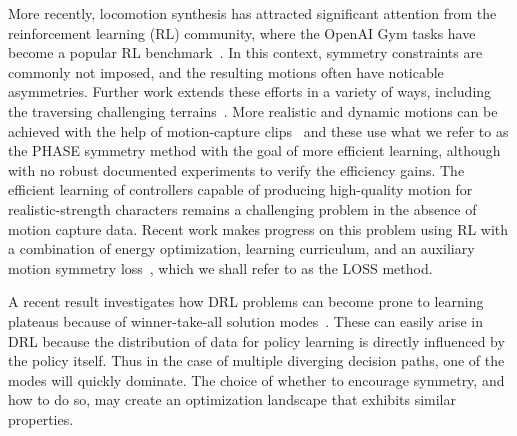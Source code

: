 More recently, locomotion synthesis has attracted significant
attention from the reinforcement learning (RL) community, where the OpenAI Gym tasks have 
become a popular RL benchmark~\cite{ref:OpenAI-Gym}. In this context, symmetry constraints are commonly 
not imposed, and the resulting motions often have noticable asymmetries. 
Further work extends these efforts in a variety of ways, including the traversing challenging terrains~\cite{ref:deepmindParkour}.
More realistic and dynamic motions can be achieved with the help of 
motion-capture clips~\cite{2017-TOG-deepLoco,2018-TOG-deepMimic} and these use
what we refer to as the PHASE symmetry method with the goal of more efficient learning, although with
no robust documented experiments to verify the efficiency gains.
The efficient learning of controllers capable of producing high-quality motion for realistic-strength characters remains
a challenging problem in the absence of motion capture data. Recent work makes
progress on this problem using RL with a combination of energy optimization, learning curriculum, and 
an auxiliary motion symmetry loss~\cite{Yu-SIGGRAPH-2018}, which we shall refer to as the LOSS method.

A recent result investigates how DRL problems can become prone to learning plateaus because
of winner-take-all solution modes~\cite{ray_interf}. These can easily arise in DRL because the distribution of data
for policy learning is directly influenced by the policy itself. Thus in the case of multiple diverging 
decision paths, one of the modes will quickly dominate. The choice of whether to encourage symmetry,
and how to do so, may create an optimization landscape that exhibits similar properties.
